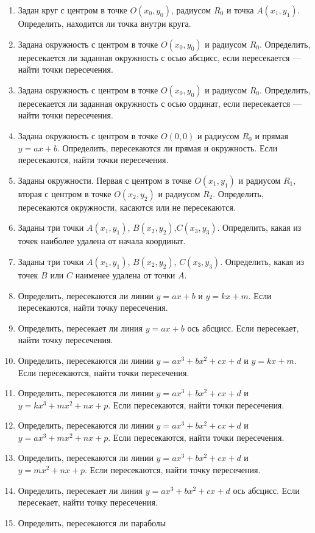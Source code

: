 \begin{enumerate}
\item Задан круг с центром в точке $O(x_0, y_0)$, радиусом $R_0$ и точка $A(x_1,y_1)$. 
Определить, находится ли точка внутри круга.
\item Задана окружность с центром в точке $O(x_0,y_0)$ и радиусом $R_0$. Определить, пересекается ли
заданная окружность с осью абсцисс, если пересекается --- найти точки пересечения.
\item Задана окружность с центром в точке $O(x_0,y_0)$ и радиусом $R_0$. Определить, пересекается ли
заданная окружность с осью ординат, если пересекается --- найти точки пересечения.
\item Задана окружность с центром в точке $O(0,0)$ и радиусом $R_0$ и
прямая $y=ax+b$. Определить, пересекаются ли прямая и
окружность. Если пересекаются, найти точки пересечения.
\item Заданы окружности. Первая с центром в точке $O(x_1,y_1)$ и радиусом
$R_1$, вторая с центром в точке $O(x_2,y_2)$ и радиусом
$R_2$. Определить, пересекаются окружности, касаются или не пересекаются.
\item Заданы три точки
$A(x_1,y_1)$, $B(x_2,y_2)$,$C(x_3,y_3)$. Определить, какая
из точек наиболее удалена от начала координат.
\item Заданы три точки $A(x_1,y_1)$, $B(x_2,y_2)$, $C(x_3,y_3)$. Определить, какая
из точек $B$ или $C$ наименее удалена от точки $A$.
\item Определить, пересекаются ли линии $y=ax+b$ и
$y=kx+m$. Если пересекаются, найти точку пересечения.
\item Определить, пересекает ли линия $y=ax+b$ ось абсцисс. Если пересекает, найти точку пересечения.
\item Определить, пересекаются ли линии
$y=ax^3+bx^2+cx+d$ и $y=kx+m$. Если пересекаются, найти точки пересечения.
\item Определить, пересекаются ли линии
$y=ax^3+bx^2+cx+d$
и
$y=kx^3+mx^2+nx+p$.
Если пересекаются, найти точки пересечения.
\item Определить, пересекаются ли линии
$y=ax^3+bx^2+cx+d$
и
$y=ax^3+mx^2+nx+p$.
Если пересекаются, найти точки пересечения.
\item Определить, пересекаются ли линии
$y=ax^3+bx^2+cx+d$
и $y=mx^2+nx+p$. Если
пересекаются, найти точку пересечения.
\item Определить, пересекает ли линия
$y=ax^3+bx^2+cx+d$
ось абсцисс. Если пересекает, найти точку пересечения.
\item Определить, пересекаются ли параболы

\end{enumerate}
